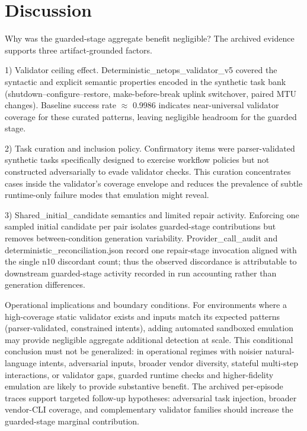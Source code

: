 \documentclass[conference]{IEEEtran}
\begin{document}
\section{Discussion}
Why was the guarded-stage aggregate benefit negligible? The archived evidence supports three artifact-grounded factors.

1) Validator ceiling effect. Deterministic\_netops\_validator\_v5 covered the syntactic and explicit semantic properties encoded in the synthetic task bank (shutdown--configure--restore, make-before-break uplink switchover, paired MTU changes). Baseline success rate \ensuremath{\approx} 0.9986 indicates near-universal validator coverage for these curated patterns, leaving negligible headroom for the guarded stage.

2) Task curation and inclusion policy. Confirmatory items were parser-validated synthetic tasks specifically designed to exercise workflow policies but not constructed adversarially to evade validator checks. This curation concentrates cases inside the validator's coverage envelope and reduces the prevalence of subtle runtime-only failure modes that emulation might reveal.

3) Shared\_initial\_candidate semantics and limited repair activity. Enforcing one sampled initial candidate per pair isolates guarded-stage contributions but removes between-condition generation variability. Provider\_call\_audit and deterministic\_reconciliation.json record one repair-stage invocation aligned with the single n10 discordant count; thus the observed discordance is attributable to downstream guarded-stage activity recorded in run accounting rather than generation differences.

Operational implications and boundary conditions. For environments where a high-coverage static validator exists and inputs match its expected patterns (parser-validated, constrained intents), adding automated sandboxed emulation may provide negligible aggregate additional detection at scale. This conditional conclusion must not be generalized: in operational regimes with noisier natural-language intents, adversarial inputs, broader vendor diversity, stateful multi-step interactions, or validator gaps, guarded runtime checks and higher-fidelity emulation are likely to provide substantive benefit. The archived per-episode traces support targeted follow-up hypotheses: adversarial task injection, broader vendor-CLI coverage, and complementary validator families should increase the guarded-stage marginal contribution.
\end{document}
